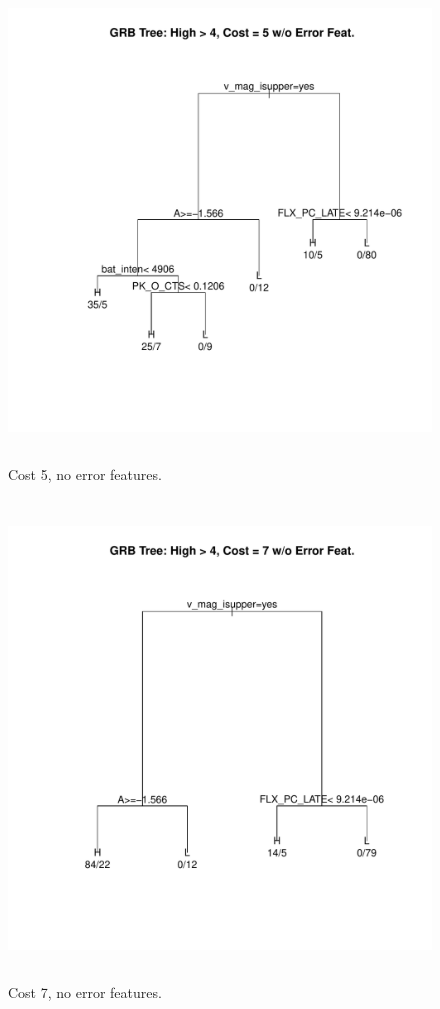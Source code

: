 \documentclass[10pt]{article}
\begin{document}
\begin{figure}[H]
\begin{center}
\includegraphics[height=5in,width=5in]{noErrorCost5.pdf}
\caption{Cost 5, no error features.\label{fig:noErrorCost5}}
\end{center}
\end{figure}



\begin{figure}[H]
\begin{center}
\includegraphics[height=5in,width=5in]{noErrorCost7.pdf}
\caption{Cost 7, no error features.\label{fig:noErrorCost7}}
\end{center}
\end{figure}
\end{document}
